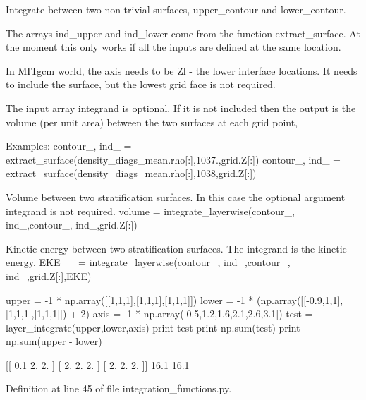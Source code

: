 Integrate between two non-\/trivial surfaces, \textquotesingle{}upper\+\_\+contour\textquotesingle{} and \textquotesingle{}lower\+\_\+contour\textquotesingle{}. 

The arrays ind\+\_\+upper and ind\+\_\+lower come from the function extract\+\_\+surface. At the moment this only works if all the inputs are defined at the same location.

In M\+I\+Tgcm world, the axis needs to be Zl -\/ \textquotesingle{}the lower interface locations\textquotesingle{}. It needs to include the surface, but the lowest grid face is not required.

The input array \textquotesingle{}integrand\textquotesingle{} is optional. If it is not included then the output is the volume (per unit area) between the two surfaces at each grid point,

Examples\+: contour\+\_, ind\+\_ = extract\+\_\+surface(density\+\_\+diags\+\_\+mean.\+rho\mbox{[}\+:\mbox{]},1037.,grid.\+Z\mbox{[}\+:\mbox{]}) contour\+\_, ind\+\_ = extract\+\_\+surface(density\+\_\+diags\+\_\+mean.\+rho\mbox{[}\+:\mbox{]},1038,grid.\+Z\mbox{[}\+:\mbox{]})

Volume between two stratification surfaces. In this case the optional argument \textquotesingle{}integrand\textquotesingle{} is not required. volume = integrate\+\_\+layerwise(contour\+\_, ind\+\_,contour\+\_, ind\+\_,grid.\+Z\mbox{[}\+:\mbox{]})

Kinetic energy between two stratification surfaces. The integrand is the kinetic energy. E\+K\+E\+\_\+\_ = integrate\+\_\+layerwise(contour\+\_, ind\+\_,contour\+\_, ind\+\_,grid.\+Z\mbox{[}\+:\mbox{]},E\+K\+E)

\begin{DoxyVerb} upper = -1 * np.array([[1,1,1],[1,1,1],[1,1,1]])
 lower = -1 * (np.array([[-0.9,1,1],[1,1,1],[1,1,1]]) + 2)
 axis = -1 * np.array([0.5,1.2,1.6,2.1,2.6,3.1])
 test = layer_integrate(upper,lower,axis)
 print test
 print np.sum(test)
 print np.sum(upper - lower)

 [[ 0.1  2.   2. ]
  [ 2.   2.   2. ]
  [ 2.   2.   2. ]]
 16.1
 16.1\end{DoxyVerb}
 

Definition at line 45 of file integration\+\_\+functions.\+py.

\hypertarget{namespacemitgcm_1_1integration__functions_ab58f08cbb74ce479d02792a6ba53686a}{}
